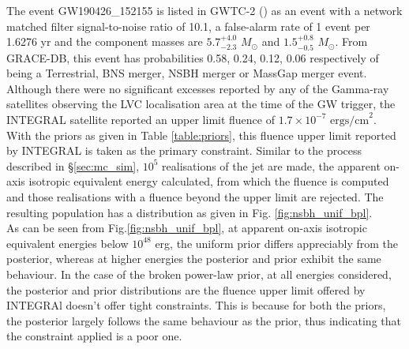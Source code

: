     The event GW190426\_152155 is listed in GWTC-2 (\cite{abbott_2020A}) as an event with
    a network matched filter signal-to-noise ratio of 10.1, a false-alarm rate of 1
    event per 1.6276 yr and the component masses are $5.7^{+4.0}_{-2.3}$ $M_{\odot}$ and
    $1.5^{+0.8}_{-0.5}$ $M_{\odot}$. From GRACE-DB, this event has probabilities 0.58,
    0.24, 0.12, 0.06 respectively of being a Terrestrial, BNS merger, NSBH merger or
    MassGap merger event.\\ Although there were no significant excesses reported by any
    of the Gamma-ray satellites observing the LVC localisation area at the time of the
    GW trigger, the INTEGRAL satellite reported an upper limit fluence of $1.7 \times
    10^{-7} \text{ ergs/cm}^2$. With the priors as given in Table \ref{table:priors},
    this fluence upper limit reported by INTEGRAL is taken as the primary constraint.
    Similar to the process described in \S\ref{sec:mc_sim}, $10^5$ realisations of the
    jet are made, the apparent on-axis isotropic equivalent energy calculated, from
    which the fluence is computed and those realisations with a fluence beyond the upper
    limit are rejected. The resulting population has a distribution as given in Fig.
    \ref{fig:nsbh_unif_bpl}.\\
    As can be seen from Fig.\ref{fig:nsbh_unif_bpl}, at apparent on-axis isotropic
    equivalent energies below $10^{48}$ erg, the uniform prior differs appreciably from
    the posterior, whereas at higher energies the posterior and prior exhibit the same
    behaviour. In the case of the broken power-law prior, at all energies considered,
    the posterior and prior distributions are  the fluence upper limit offered by
    INTEGRAl doesn't offer tight constraints. This is because for both the priors, the
    posterior largely follows the same behaviour as the prior, thus indicating that the
    constraint applied is a poor one.


